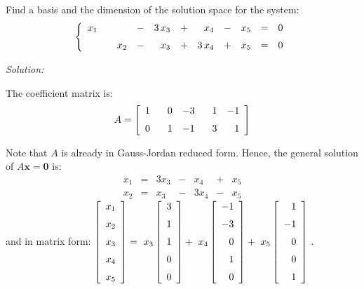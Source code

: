 \documentclass[12pt]{article}
\newcommand{\solution}[2]{\ifthenelse{\boolean{showsol}}%
{\vskip10pt\noindent\emph{Solution:}\vskip10pt #2}{\vskip #1}}
\newcommand{\pnum}[1]{\noindent {\hskip -18pt \bfseries #1.}}
\begin{document}
\clearpage


\pnum{4} Find a basis and the dimension of the solution space 
for the system:
\[
\left\{
\begin {array}{rrrrrrrrrrr} 
x_{{1}}&&&-&3\,x_{{3}}&+&x_{{4}}&-&x_{{5}}&=&0 \\
\noalign{\medskip}&&x_{{2}}&-&x_{{3}}&+&3\,x_{{4}}&+&x_{{5}}&=&0
\end {array}
\right.
\]

\solution{2.5in}{\par
The coefficient matrix is:
\[
A =
\left [\begin{array}{rrrrr} 
1&\phantom{-}0&-3&\phantom{-}1&-1\\\noalign{\medskip}
0&1&-1&3&1
\end{array}\right ]
\]

Note that $A$ is already in Gauss-Jordan reduced form.
Hence, the general solution of $A\mathbf{x} =\mathbf{0}$ is:
\[
\begin{array}{rrrrrrr}
x_1 & = & 3 x_3 & - & x_4 & + & x_5 \\
x_2 & = & x_3 & - & 3 x_4 & - & x_5
\end{array}
\] 
and in matrix form:
$\displaystyle{
\left [\begin {array}{r} x_{{1}}\\\noalign{\medskip}x_{{2}}
\\\noalign{\medskip}x_{{3}}\\\noalign{\medskip}x_{{4}}
\\\noalign{\medskip}x_{{5}}\end {array}\right ]=\ x_{{3}} \left [
\begin {array}{r} 3\\\noalign{\medskip}1\\\noalign{\medskip}1
\\\noalign{\medskip}0\\\noalign{\medskip}0\end {array}\right ]+\ x_{{4}}
\left [\begin {array}{r} -1\\\noalign{\medskip}-3\\\noalign{\medskip}0
\\\noalign{\medskip}1\\\noalign{\medskip}0\end {array}\right ]+\ x_{{5}}
\left [\begin {array}{r} 1\\\noalign{\medskip}-1\\\noalign{\medskip}0
\\\noalign{\medskip}0\\\noalign{\medskip}1\end {array}\right ]\,.
}$

}
\end{document}
